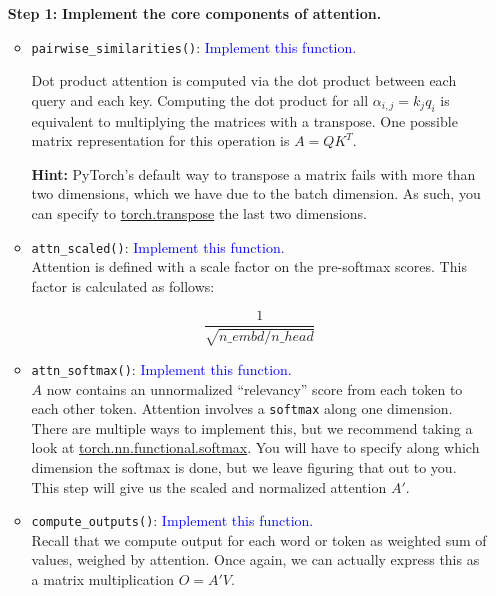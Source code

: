 \documentclass{article}
\begin{document}
\begin{enumerate}
\begin{itemize}
       \end{itemize}

        
        \item[\textbf{Step 1:}]
        \textbf{Implement the core components of attention.}

        \begin{itemize}
        
        \item \verb|pairwise_similarities()|: \textcolor{blue}{Implement this
        function.}
        
        Dot product attention is computed via the dot product between each query
        and each key. Computing the dot product for all $\alpha_{i,j} = k_j q_i$
        is equivalent to multiplying the matrices with a transpose. One possible
        matrix representation for this operation is $A = Q K^T$.
        
        \textbf{Hint:} PyTorch's default way to transpose a matrix fails with
        more than two dimensions, which we have due to the batch dimension. As
        such, you can specify to
        \href{https://pytorch.org/docs/stable/generated/torch.transpose}{torch.transpose}
        the last two dimensions. 


        \item \verb|attn_scaled()|: \textcolor{blue}{Implement this function.}
        \\
        Attention is defined with a scale factor on the pre-softmax scores. This
        factor is calculated as follows:
        
        $$\frac {1}{\sqrt{n\_embd / n\_head}}$$

        \item \verb|attn_softmax()|: \textcolor{blue}{Implement this function.}
        \\
        $A$ now contains an unnormalized ``relevancy'' score from each token to
        each other token. Attention involves a \verb|softmax| along one
        dimension. There are multiple ways to implement this, but we recommend
        taking a look at
        \href{https://pytorch.org/docs/stable/generated/torch.nn.functional.softmax}{torch.nn.functional.softmax}.
        You will have to specify along which dimension the softmax is done, but
        we leave figuring that out to you. This step will give us the scaled and
        normalized attention $A'$.

        \item \verb|compute_outputs()|: \textcolor{blue}{Implement this
        function.} \\
        Recall that we compute output for each word or token as weighted sum of
        values, weighed by attention. Once again, we can actually express this
        as a matrix multiplication $O = A' V$.
        

\end{itemize}
\end{enumerate}
\end{document}
